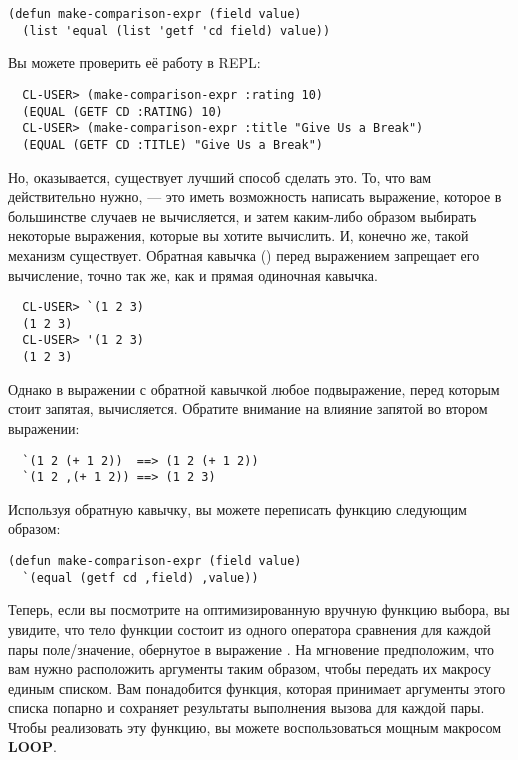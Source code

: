 \begin{lstlisting}
(defun make-comparison-expr (field value)
  (list 'equal (list 'getf 'cd field) value))
\end{lstlisting}

Вы можете проверить её работу в REPL:

\begin{verbatim}
  CL-USER> (make-comparison-expr :rating 10)
  (EQUAL (GETF CD :RATING) 10)
  CL-USER> (make-comparison-expr :title "Give Us a Break")
  (EQUAL (GETF CD :TITLE) "Give Us a Break")
\end{verbatim}

Но, оказывается, существует лучший способ сделать это. То, что вам действительно нужно,
--- это иметь возможность написать выражение, которое в большинстве случаев не
вычисляется, и затем каким-либо образом выбирать некоторые выражения, которые вы хотите
вычислить. И, конечно же, такой механизм существует. Обратная кавычка () перед
выражением запрещает его вычисление, точно так же, как и прямая одиночная кавычка.

\begin{verbatim}
  CL-USER> `(1 2 3)
  (1 2 3)
  CL-USER> '(1 2 3)
  (1 2 3)
\end{verbatim}

Однако в выражении с обратной кавычкой любое подвыражение, перед которым стоит запятая,
вычисляется. Обратите внимание на влияние запятой во втором выражении:

\begin{verbatim}
  `(1 2 (+ 1 2))  ==> (1 2 (+ 1 2))
  `(1 2 ,(+ 1 2)) ==> (1 2 3)
\end{verbatim}

Используя обратную кавычку, вы можете переписать функцию  следующим образом:

\begin{lstlisting}
(defun make-comparison-expr (field value)
  `(equal (getf cd ,field) ,value))
\end{lstlisting}

Теперь, если вы посмотрите на оптимизированную вручную функцию выбора, вы увидите, что
тело функции состоит из одного оператора сравнения для каждой пары поле/значение,
обернутое в выражение . На мгновение предположим, что вам нужно расположить
аргументы таким образом, чтобы передать их макросу  единым списком. Вам
понадобится функция, которая принимает аргументы этого списка попарно и сохраняет
результаты выполнения вызова  для каждой пары. Чтобы
реализовать эту функцию, вы можете воспользоваться мощным макросом \textbf{LOOP}.

